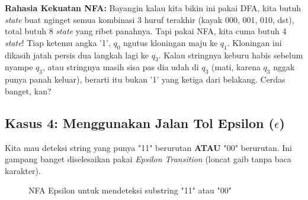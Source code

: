 \documentclass[12pt,a4paper]{article}
\begin{document}
\textbf{Rahasia Kekuatan NFA:}
Bayangin kalau kita bikin ini pakai DFA, kita butuh \textit{state} buat nginget semua kombinasi 3 huruf terakhir (kayak 000, 001, 010, dst), total butuh 8 \textit{state} yang ribet panahnya.
Tapi pakai NFA, kita cuma butuh 4 \textit{state}! Tiap ketemu angka '1', $q_0$ ngutus kloningan maju ke $q_1$. Kloningan ini dikasih jatah persis dua langkah lagi ke $q_3$. Kalau stringnya keburu habis sebelum nyampe $q_3$, atau stringnya masih sisa pas dia udah di $q_3$ (mati, karena $q_3$ nggak punya panah keluar), berarti itu bukan '1' yang ketiga dari belakang. Cerdas banget, kan?

\subsection{Kasus 4: Menggunakan Jalan Tol Epsilon ($\epsilon$)}
Kita mau deteksi string yang punya "11" berurutan \textbf{ATAU} "00" berurutan. Ini gampang banget diselesaikan pakai \textit{Epsilon Transition} (loncat gaib tanpa baca karakter).

\begin{figure}[h]
    \centering
    \caption{NFA Epsilon untuk mendeteksi substring "11" atau "00"}
\end{figure}
\end{document}
